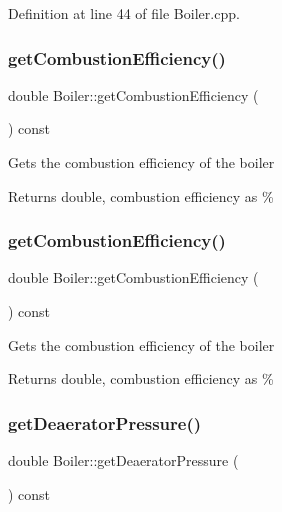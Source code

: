 Definition at line 44 of file Boiler.\+cpp.

\mbox{\label{class_boiler_a21c7423b756761c3216704b3f554feff}} 
\subsubsection{\texorpdfstring{get\+Combustion\+Efficiency()}{getCombustionEfficiency()}\hspace{0.1cm}{\footnotesize\ttfamily [2/3]}}
{\footnotesize\ttfamily double Boiler\+::get\+Combustion\+Efficiency (\begin{DoxyParamCaption}{ }\end{DoxyParamCaption}) const}

Gets the combustion efficiency of the boiler \begin{DoxyReturn}{Returns}
double, combustion efficiency as \% 
\end{DoxyReturn}
\mbox{\label{class_boiler_a21c7423b756761c3216704b3f554feff}} 
\subsubsection{\texorpdfstring{get\+Combustion\+Efficiency()}{getCombustionEfficiency()}\hspace{0.1cm}{\footnotesize\ttfamily [3/3]}}
{\footnotesize\ttfamily double Boiler\+::get\+Combustion\+Efficiency (\begin{DoxyParamCaption}{ }\end{DoxyParamCaption}) const}

Gets the combustion efficiency of the boiler \begin{DoxyReturn}{Returns}
double, combustion efficiency as \% 
\end{DoxyReturn}
\mbox{\label{class_boiler_aad4786e7b68084e65a35dd6235517b8c}} 
\subsubsection{\texorpdfstring{get\+Deaerator\+Pressure()}{getDeaeratorPressure()}\hspace{0.1cm}{\footnotesize\ttfamily [1/3]}}
{\footnotesize\ttfamily double Boiler\+::get\+Deaerator\+Pressure (\begin{DoxyParamCaption}{ }\end{DoxyParamCaption}) const}

